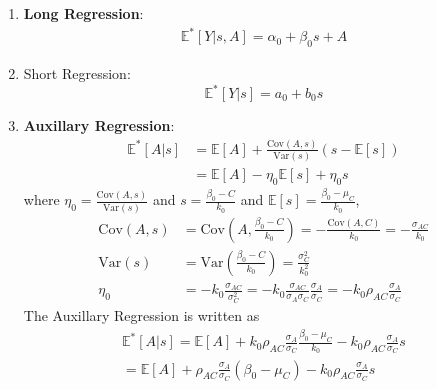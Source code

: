 \documentclass[11pt]{elegantbook}
\begin{document}
\begin{enumerate}
    \item \textbf{Long Regression}:
    \begin{equation}
        \begin{aligned}
            \mathbb{E}^*[Y|s,A]=\alpha_0+\beta_0s+A
        \end{aligned}
        \tag{LR}
        \label{LR}
    \end{equation}
    \item Short Regression: $$\mathbb{E}^*[Y|s]=a_0+b_0s$$
    \item \textbf{Auxillary Regression}:
    \begin{equation}
        \begin{aligned}
            \mathbb{E}^*[A|s]&=\mathbb{E}[A]+\frac{\text{Cov}(A,s)}{\text{Var}(s)}\left(s-\mathbb{E}[s]\right)\\
            &=\mathbb{E}[A]-\eta_0\mathbb{E}[s]+\eta_0 s
        \end{aligned}
        \tag{AR}
        \label{AR}
    \end{equation}
    where $\eta_0=\frac{\text{Cov}(A,s)}{\text{Var}(s)}$ and $s=\frac{\beta_0-C}{k_0}$ and $\mathbb{E}[s]=\frac{\beta_0-\mu_C}{k_0}$,
    \begin{equation}
        \begin{aligned}
            \text{Cov}(A,s)&=\text{Cov}\left(A,\frac{\beta_0-C}{k_0}\right)=-\frac{\text{Cov}(A,C)}{k_0}=-\frac{\sigma_{AC}}{k_0}\\
            \text{Var}(s)&=\text{Var}\left(\frac{\beta_0-C}{k_0}\right)=\frac{\sigma_C^2}{k_0^2}\\
            \eta_0&=-k_0\frac{\sigma_{AC}}{\sigma_C^2}=-k_0\frac{\sigma_{AC}}{\sigma_A\sigma_C}\frac{\sigma_A}{\sigma_C}=-k_0\rho_{AC}\frac{\sigma_A}{\sigma_C}
        \end{aligned}
        \nonumber
    \end{equation}
    The Auxillary Regression is written as
    \begin{equation}
        \begin{aligned}
            \mathbb{E}^*[A|s]=\mathbb{E}[A]+k_0\rho_{AC}\frac{\sigma_A}{\sigma_C}\frac{\beta_0-\mu_C}{k_0}-k_0\rho_{AC}\frac{\sigma_A}{\sigma_C} s\\
            =\mathbb{E}[A]+\rho_{AC}\frac{\sigma_A}{\sigma_C}(\beta_0-\mu_C)-k_0\rho_{AC}\frac{\sigma_A}{\sigma_C} s
        \end{aligned}
        \tag{AR-1}
        \label{AR-1}
    \end{equation}

\end{enumerate}
\end{document}
